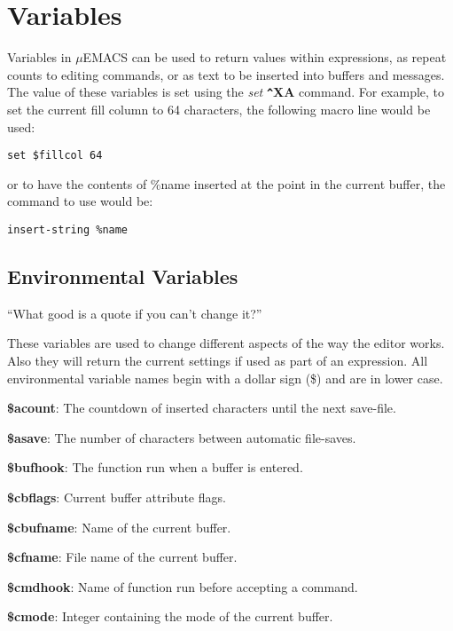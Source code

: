 \section{Variables}

Variables in $\mu$EMACS can be used to return values within
expressions, as repeat counts to editing commands, or as text to be
inserted into buffers and messages. The value of these variables is set
using the {\it set} {\bf \verb+^+XA} command. For example, to set the
current fill column to 64 characters, the following macro line would be
used:

\begin{verbatim}
set $fillcol 64
\end{verbatim}

or to have the contents of \%name inserted at the point in the current
buffer, the command to use would be:

\begin{verbatim}
insert-string %name
\end{verbatim}

\subsection{Environmental Variables}

``What good is a quote if you can't change it?''

These variables are used to change different aspects of the way the
editor works. Also they will return the current settings if used as
part of an expression. All environmental variable names begin with a
dollar sign (\$) and are in lower case.

{\bf \$acount}: The countdown of inserted characters until the next save-file.

{\bf \$asave}: The number of characters between automatic file-saves.

{\bf \$bufhook}: The function run when a buffer is entered.

{\bf \$cbflags}: Current buffer attribute flags.

{\bf \$cbufname}: Name of the current buffer.

{\bf \$cfname}: File name of the current buffer.

{\bf \$cmdhook}: Name of function run before accepting a command.

{\bf \$cmode}: Integer containing the mode of the current buffer.

